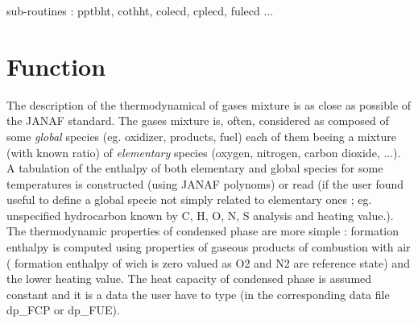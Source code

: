 
%
%
%
%


{\huge sub-routines : pptbht, cothht, colecd, cplecd, fulecd ...}

\section{Function}

The description of the thermodynamical of gases mixture is as close as possible
of the JANAF standard. The gases mixture is, often, considered as composed of
some {\em global} species ({\small eg. oxidizer, products, fuel}) each of them
beeing a mixture ({\small with known ratio}) of {\em elementary} species
({\small oxygen, nitrogen, carbon dioxide, ...}).\\ A tabulation of the enthalpy
of both elementary and global species for some temperatures is constructed
({\small using JANAF polynoms}) or read ({\small if the user found useful to
define a global specie not simply related to elementary ones ; eg. unspecified
hydrocarbon known by C, H, O, N, S analysis and heating value.}).\\ The
thermodynamic properties of condensed phase are more simple : formation enthalpy
is computed using properties of gaseous products of combustion with air ({\small
formation enthalpy of wich is zero valued as O2 and N2 are reference state}) and
the lower heating value. The heat capacity of condensed phase is assumed
constant and it is a data the user have to type ({\small in the corresponding
data file dp\_FCP or dp\_FUE}).


